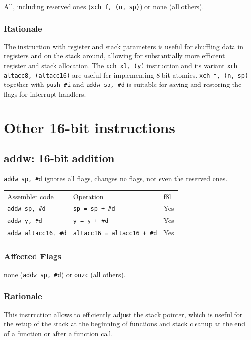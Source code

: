 \documentclass{book}
\begin{document}
All, including reserved ones (\texttt{xch f, (n, sp)}) or none (all others).

\subsubsection*{Rationale}

The instruction with register and stack parameters is useful for shuffling data in registers and on the stack around, allowing for substantially more efficient register and stack allocation. The \texttt{xch xl, (y)} instruction and its variant \texttt{xch altacc8, (altacc16)} are useful for implementing 8-bit atomics. \texttt{xch f, (n, sp)} together with \texttt{push \#i} and \texttt{addw sp, \#d} is suitable for saving and restoring the flags for interrupt handlers.


\section{Other 16-bit instructions}

\subsection{addw: 16-bit addition}

\texttt{addw sp, \#d} ignores all flags, changes no flags, not even the reserved ones.

\begin{tabular}{l l l}
Assembler code              & Operation                          & f8l \\
\texttt{addw sp, \#d}       & \texttt{sp = sp + \#d}             & Yes \\
\texttt{addw y, \#d}        & \texttt{y = y + \#d}               & Yes \\
\texttt{addw altacc16, \#d} & \texttt{altacc16 = altacc16 + \#d} & Yes
\end{tabular}

\subsubsection*{Affected Flags}

none (\texttt{addw sp, \#d}) or \texttt{onzc} (all others).

\subsubsection*{Rationale}

This instruction allows to efficiently adjust the stack pointer, which is useful for the setup of the stack at the beginning of functions and stack cleanup at the end of a function or after a function call.
\end{document}
